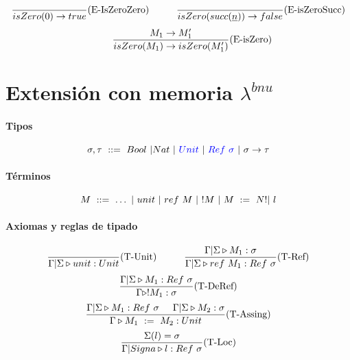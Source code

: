 \documentclass[10pt,a4paper]{article}
\begin{document}
\vspace*{5mm}
\begin{equation*}
\frac{}{isZero(0)\to true}(\text{E-IsZeroZero})\hspace*{1cm}\frac{}{isZero(succ(\underline{n}))\to false}(\text{E-isZeroSucc})
\end{equation*}
\vspace*{5mm}
\begin{equation*}
\hspace*{1cm}\frac{M_1\to M'_1}{isZero(M_1)\to isZero(M_1')}(\text{E-isZero})
\end{equation*}

\newpage
\section{Extensión con memoria $\lambda^{bnu}$}
\paragraph{Tipos}
$$\sigma, \tau ~::=~ Bool~|Nat~|~\color{blue}Unit\color{black}~|~\color{blue}Ref~\sigma\color{black}~|~\sigma\to\tau$$

\paragraph{Términos}

$$ M~::=~ \dots~|~unit~|~ref~M~|~!M~|~M~:=~N!|~    l$$

\paragraph{Axiomas y reglas de tipado}
\begin{equation*}
\frac{}{\Gamma|\Sigma\triangleright unit : Unit}(\text{T-Unit})\hspace*{1cm}\frac{\Gamma|\Sigma\triangleright M_1 : \sigma}{\Gamma|\Sigma\triangleright ref~M_1 : Ref~\sigma}(\text{T-Ref})
\end{equation*}
\vspace*{5mm}
\begin{equation*}
\frac{\Gamma|\Sigma\triangleright M_1 : Ref~\sigma}{\Gamma\triangleright !M_1 : \sigma}(\text{T-DeRef})
\end{equation*}
\vspace*{5mm}
\begin{equation*}
\frac{\Gamma|\Sigma\triangleright M_1 : Ref~\sigma\hspace*{5mm}\Gamma|\Sigma\triangleright M_2 : \sigma}{\Gamma\triangleright M_1~:=~M_2 : Unit}(\text{T-Assing})
\end{equation*}
\vspace*{5mm}
\begin{equation*}
\frac{\Sigma(l) = \sigma}{\Gamma|Signa\triangleright l : Ref~\sigma}(\text{T-Loc})
\end{equation*}
\end{document}
